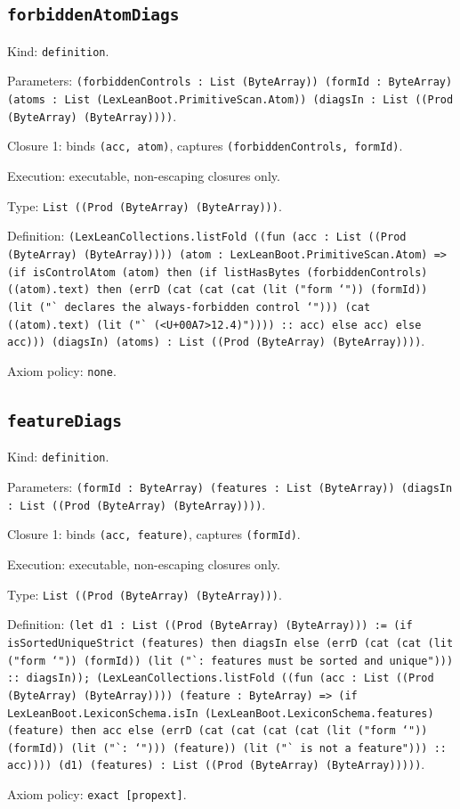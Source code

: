 \documentclass[11pt]{article}
\begin{document}
\subsection*{\texttt{forbiddenAtomDiags}}
\noindent Kind: \texttt{definition}.\par
\noindent Parameters: \texttt{(forbiddenControls : List (ByteArray)) (formId : ByteArray) (atoms : List (LexLeanBoot.PrimitiveScan.Atom)) (diagsIn : List ((Prod (ByteArray) (ByteArray))))}.\par
\noindent Closure 1: binds \texttt{(acc, atom)}, captures \texttt{(forbiddenControls, formId)}.\par
\noindent Execution: executable, non-escaping closures only.\par
\noindent Type: \texttt{List ((Prod (ByteArray) (ByteArray)))}.\par
\noindent Definition: \texttt{(LexLeanCollections.listFold ((fun (acc : List ((Prod (ByteArray) (ByteArray)))) (atom : LexLeanBoot.PrimitiveScan.Atom) => (if isControlAtom (atom) then (if listHasBytes (forbiddenControls) ((atom).text) then (errD (cat (cat (cat (lit ("form `")) (formId)) (lit ("` declares the always-forbidden control `"))) (cat ((atom).text) (lit ("` (<U+00A7>12.4)")))) :: acc) else acc) else acc))) (diagsIn) (atoms) : List ((Prod (ByteArray) (ByteArray))))}.\par
\noindent Axiom policy: \texttt{none}.\par
\subsection*{\texttt{featureDiags}}
\noindent Kind: \texttt{definition}.\par
\noindent Parameters: \texttt{(formId : ByteArray) (features : List (ByteArray)) (diagsIn : List ((Prod (ByteArray) (ByteArray))))}.\par
\noindent Closure 1: binds \texttt{(acc, feature)}, captures \texttt{(formId)}.\par
\noindent Execution: executable, non-escaping closures only.\par
\noindent Type: \texttt{List ((Prod (ByteArray) (ByteArray)))}.\par
\noindent Definition: \texttt{(let d1 : List ((Prod (ByteArray) (ByteArray))) := (if isSortedUniqueStrict (features) then diagsIn else (errD (cat (cat (lit ("form `")) (formId)) (lit ("`: features must be sorted and unique"))) :: diagsIn)); (LexLeanCollections.listFold ((fun (acc : List ((Prod (ByteArray) (ByteArray)))) (feature : ByteArray) => (if LexLeanBoot.LexiconSchema.isIn (LexLeanBoot.LexiconSchema.features) (feature) then acc else (errD (cat (cat (cat (cat (lit ("form `")) (formId)) (lit ("`: `"))) (feature)) (lit ("` is not a feature"))) :: acc)))) (d1) (features) : List ((Prod (ByteArray) (ByteArray)))))}.\par
\noindent Axiom policy: \texttt{exact [propext]}.\par
\end{document}
